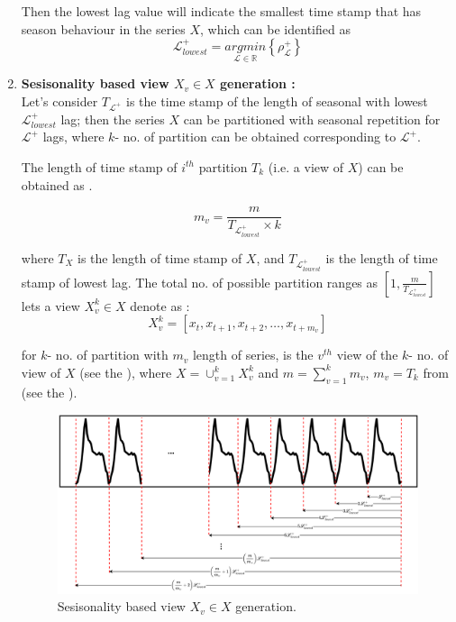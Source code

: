 \documentclass[a4paper, fleqn]{cas-sc}
\theoremstyle{definition}
\theoremstyle{remark}
\begin{document}
\begin{enumerate}[label=(\alph*)]
Then the lowest lag value will indicate the smallest time stamp that has season behaviour in the series $X$, which can be identified as
\begin{equation} \label{lxl}
  \mathscr{L}_{lowest}^+ = \underset{\mathscr{L} \in \mathbb{R}}{arg min} \left\{\rho_{\mathscr{L}}^+  \right\}
\end{equation}



\item \textbf{Sesisonality based view $X_v \in X$ generation :  } \\
Let's consider $T_{\mathscr{L} ^+}$ is the time stamp of the length of seasonal with lowest $\mathscr{L}_{lowest}^+$ lag; then the series $X$ can be partitioned with seasonal repetition for $\mathscr{L}^+$ lags,  where $k$- no. of partition can be obtained corresponding to $\mathscr{L}^+$.

The length of time stamp of $i^{th}$ partition $T_k$ (i.e. a view of $X$) can be obtained as .

\begin{equation} \label{vvtk}
  m_v=\frac{m}{T_{ \mathscr{L}_{lowest}^+ }\times k}
\end{equation}

where $T_X$ is the length of time stamp of $X$,  and $T_{ \mathscr{L}_{lowest}^+ }$ is the length of time stamp of lowest lag.
The total no. of possible partition ranges as $\left[1,  \frac{m}{T_{\mathscr{L}_{lowest}^+ }} \right]$
lets a view $X_v^k \in X$ denote as : 
\begin{equation} \label{vi g}
  X_v^k = [x_t, x_{t+1}, x_{t+2},  \dots , x_{t+m_v}]
\end{equation}

 for $k$- no. of partition with $m_v$ length of series,  is the $v^{th}$ view of the $k$- no. of view of $X$ (see the  ),  where $X=\cup_{v=1}^k {X_v^k}$ and $m= \sum_{v=1}^{k} m_v$,  $m_v = T_k$ from  (see the ).

 \begin{figure}\label{view gen}
  \centering
  \includegraphics[scale=.6]{se_view}
  \caption{Sesisonality based view $X_v \in X$ generation.}
 \end{figure}



\end{enumerate}
\end{document}
